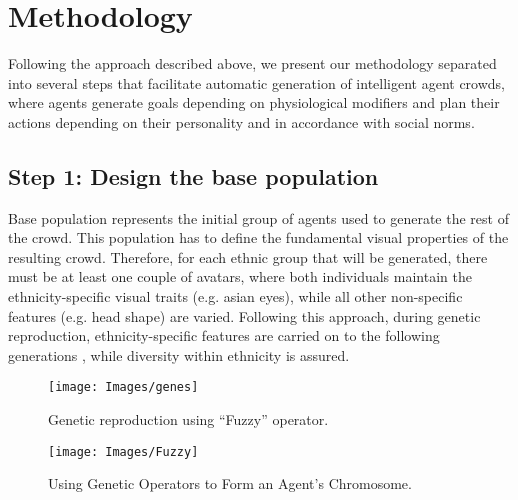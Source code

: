 \documentclass[graybox]{svmult}
\begin{document}
\section{Methodology}
\label{sec:Methodology}


Following the approach described above,  we present our methodology separated into several steps that facilitate automatic generation of intelligent agent crowds, where agents generate goals depending on physiological modifiers and plan their actions depending on their personality and in accordance with social norms.


\subsection{Step 1: Design the base population}

\label{sec:step1}

Base population represents the initial group of agents used to generate the rest of the crowd. This population has to define the fundamental visual properties of the resulting crowd. Therefore, for each ethnic group that will be generated, there must be at least one couple of avatars, where both individuals maintain the ethnicity-specific visual traits (e.g. asian eyes), while all other non-specific features (e.g. head shape) are varied. Following this approach, during genetic reproduction, ethnicity-specific features are carried on to the following generations \cite{trescak2012v}, while diversity within ethnicity is assured.


%
\begin{figure}[!ht]
\sidecaption[t]
\texttt{[image: Images/genes]}
\caption{Genetic reproduction using ``Fuzzy'' operator.}
\label{fig:genetics}       %
\end{figure}


\begin{figure}[!ht]
\sidecaption[t]
\texttt{[image: Images/Fuzzy]}
\caption{Using Genetic Operators to Form an Agent's Chromosome.}
\label{fig:fuzzy}       %
\end{figure}

 
\end{document}
